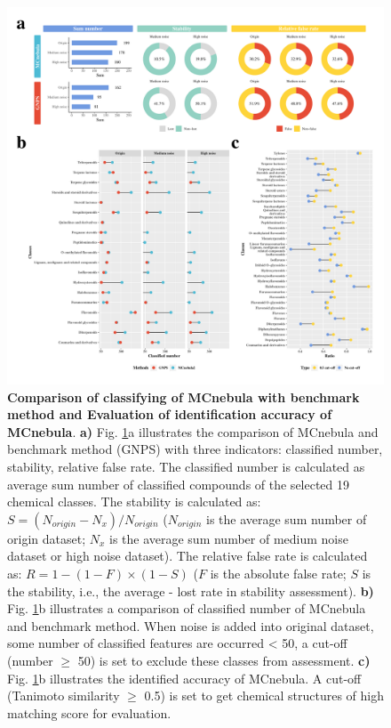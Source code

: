 \documentclass[
]{article}
\begin{document}
\begin{figure}
\hypertarget{fig:compare_accuracy}{%
\centering
\includegraphics{fig3.compare_accuracy.pdf}
\caption{\textbf{Comparison of classifying of MCnebula with benchmark
method and Evaluation of identification accuracy of MCnebula}.
\textbf{a)} Fig.
{\protect\NoHyper\ref{fig:compare_accuracy}\protect\endNoHyper}a
illustrates the comparison of MCnebula and benchmark method (GNPS) with
three indicators: classified number, stability, relative false rate. The
classified number is calculated as average sum number of classified
compounds of the selected 19 chemical classes. The stability is
calculated as: \(S = (N_{origin} - N_{x}) / N_{origin}\) (\(N_{origin}\)
is the average sum number of origin dataset; \(N_{x}\) is the average
sum number of medium noise dataset or high noise dataset). The relative
false rate is calculated as: \(R = 1 - (1 - F) \times (1 - S)\) (\(F\)
is the absolute false rate; \(S\) is the stability, i.e., the average -
lost rate in stability assessment). \textbf{b)} Fig.
{\protect\NoHyper\ref{fig:compare_accuracy}\protect\endNoHyper}b
illustrates a comparison of classified number of MCnebula and benchmark
method. When noise is added into original dataset, some number of
classified features are occurred \textless{} 50, a cut-off (number
\(\geq\) 50) is set to exclude these classes from assessment.
\textbf{c)} Fig.
{\protect\NoHyper\ref{fig:compare_accuracy}\protect\endNoHyper}b
illustrates the identified accuracy of MCnebula. A cut-off (Tanimoto
similarity \(\geq\) 0.5) is set to get chemical structures of high
matching score for evaluation.}\label{fig:compare_accuracy}
}
\end{figure}
\end{document}
